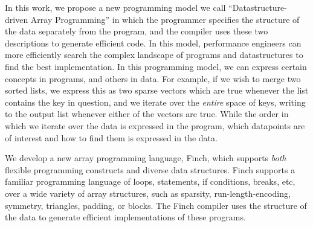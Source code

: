 


In this work, we propose a new programming model we call ``Datastructure-driven Array Programming'' in which the programmer specifies the structure of the data separately from the program, and the compiler uses these two descriptions to generate efficient code. In this model, performance engineers can more efficiently search the
complex landscape of programs and datastructures to find the best implementation. In this programming model, we can express certain concepts in programs, and others in data. For example, if we wish to merge two sorted lists, we express this as two sparse vectors which are true whenever the list contains the key in question, and we iterate over the \textit{entire} space of keys, writing to the output list whenever either of the vectors are true.
While the order in which we iterate over the data is expressed in the program, which datapoints are of interest and how to find them is expressed in the data.

We develop a new array programming language, Finch, which supports \textit{both}
flexible programming constructs and diverse data structures. Finch supports a
familiar programming language of loops, statements, if conditions, breaks, etc,
over a wide variety of array structures, such as sparsity, run-length-encoding,
symmetry, triangles, padding, or blocks. The Finch compiler uses the structure
of the data to generate efficient implementations of these programs.

